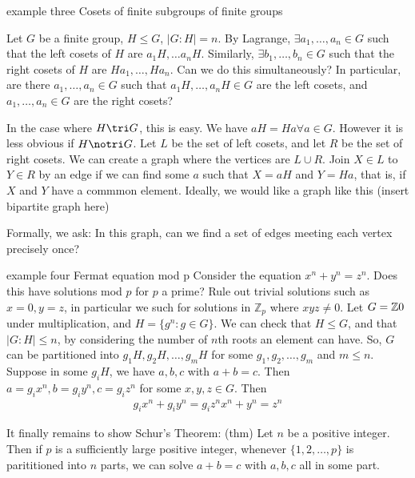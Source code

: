 \documentclass{article}
\begin{document}
example three
Cosets of finite subgroups of finite groups

Let $G$ be a finite group, $H \leq G$, $|G : H| = n$.  By Lagrange, $\exists a_1, \dots, a_n \in G$ such that the left cosets of $H$ are $a_1 H, \dots a_n H$.  Similarly, $\exists b_1, \dots, b_n \in G$ such that the right cosets of $H$ are $H a_1, \dots, H a_n$.  
Can we do this simultaneously? In particular, are there $a_1, \dots, a_n \in G$ such that $a_1 H, \dots, a_n H \in G$ are the left cosets, and $a_1, \dots, a_n \in G$ are the right cosets? 

In the case where $H \tri G$, this is easy. We have $a H = H a \forall a \in G$.  However it is less obvious if $H \notri G$.  Let $L$ be the set of left cosets, and let $R$ be the set of right cosets. We can create a graph where the vertices are $L \cup R$.  Join $X \in L$ to $Y \in R$ by an edge if we can find some $a$ such that $X = aH$ and $Y = Ha$, that is, if $X$ and $Y$ have a commmon element.  Ideally, we would like a graph like this
(insert bipartite graph here)

Formally, we ask: In this graph, can we find a set of edges meeting each vertex precisely once?

example four
Fermat equation mod p
Consider the equation $x^n + y^n = z^n$. Does this have solutions mod $p$ for $p$ a prime?  Rule out trivial solutions such as $x = 0, y = z$, in particular we such for solutions in $\mathbb{Z}_p$ where $xyz \ne 0$.
Let $G = \mathbb{Z} \\ {0}$ under multiplication, and $H = \{g^n : g \in G\}$.  We can check that $H \leq G$, and that $|G : H| \leq n$, by considering the number of $n$th roots an element can have.  So, $G$ can be partitioned into $g_1 H, g_2 H, \dots, g_mH$ for some $g_1, g_2, \dots, g_m$ and $m \leq n$.  Suppose in some $g_i H$, we have $a, b, c$ with $a + b = c$.  Then $a = g_i x^n, b = g_i y^n, c = g_i z^n$ for some $x, y, z \in G$.  Then
\begin{align}
  g_i x^n + g_i y^n = g_i z^n 
  x^n + y^n = z^n
\end{align}

It finally remains to show Schur's Theorem:
(thm) Let $n$ be a positive integer. Then if $p$ is a sufficiently large positive integer, whenever $\{1, 2, \dots, p\}$ is parititioned into $n$ parts, we can solve $a + b = c$ with $a, b, c$ all in some part.
\end{document}
